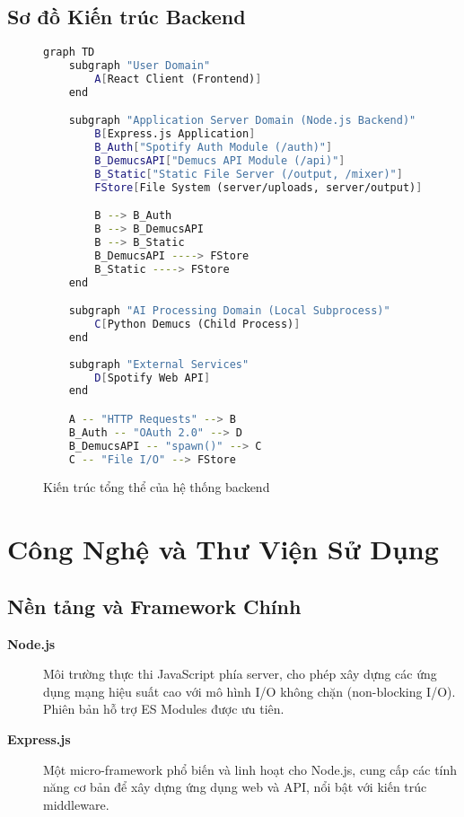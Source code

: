 \documentclass[12pt,a4paper]{article}
\begin{document}
\subsection{Sơ đồ Kiến trúc Backend}
\label{subsec:architecture-diagram}

\begin{figure}[h]
\centering
\begin{lstlisting}[language=bash, caption=Sơ đồ kiến trúc backend (Mermaid syntax)]
graph TD
    subgraph "User Domain"
        A[React Client (Frontend)]
    end

    subgraph "Application Server Domain (Node.js Backend)"
        B[Express.js Application]
        B_Auth["Spotify Auth Module (/auth)"]
        B_DemucsAPI["Demucs API Module (/api)"]
        B_Static["Static File Server (/output, /mixer)"]
        FStore[File System (server/uploads, server/output)]

        B --> B_Auth
        B --> B_DemucsAPI
        B --> B_Static
        B_DemucsAPI ----> FStore
        B_Static ----> FStore
    end

    subgraph "AI Processing Domain (Local Subprocess)"
        C[Python Demucs (Child Process)]
    end
    
    subgraph "External Services"
        D[Spotify Web API]
    end

    A -- "HTTP Requests" --> B
    B_Auth -- "OAuth 2.0" --> D
    B_DemucsAPI -- "spawn()" --> C
    C -- "File I/O" --> FStore
\end{lstlisting}
\caption{Kiến trúc tổng thể của hệ thống backend}
\label{fig:backend-architecture}
\end{figure}

\section{Công Nghệ và Thư Viện Sử Dụng}
\label{sec:technologies}

\subsection{Nền tảng và Framework Chính}
\label{subsec:main-platform}

\begin{description}
    \item[\textbf{Node.js}] Môi trường thực thi JavaScript phía server, cho phép xây dựng các ứng dụng mạng hiệu suất cao với mô hình I/O không chặn (non-blocking I/O). Phiên bản hỗ trợ ES Modules được ưu tiên.
    
    \item[\textbf{Express.js}] Một micro-framework phổ biến và linh hoạt cho Node.js, cung cấp các tính năng cơ bản để xây dựng ứng dụng web và API, nổi bật với kiến trúc middleware.
\end{description}
\end{document}
